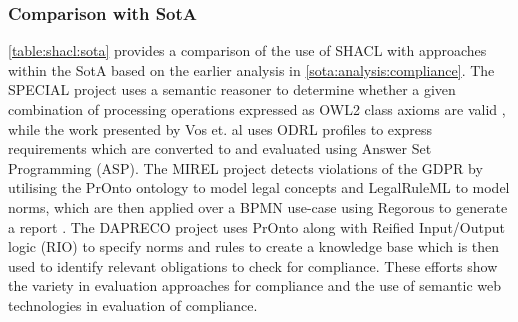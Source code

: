 \subsubsection*{Comparison with SotA}
\autoref{table:shacl:sota} provides a comparison of the use of SHACL with approaches within the SotA based on the earlier analysis in \autoref{sota:analysis:compliance}.
The SPECIAL project uses a semantic reasoner to determine whether a given combination of processing operations expressed as OWL2 class axioms are valid \cite{westphal_spirit_2018}, while the work presented by Vos et. al \cite{vos_odrl_2019} uses ODRL profiles to express requirements which are converted to and evaluated using Answer Set Programming (ASP).
The MIREL project detects violations of the GDPR by utilising the PrOnto ontology \cite{palmirani_pronto_2018,palmirani_pronto_2018-1,monica_modelling_2018} to model legal concepts and LegalRuleML to model norms, which are then applied over a BPMN use-case using Regorous to generate a report \cite{monica_modelling_2018}.
The DAPRECO project uses PrOnto along with Reified Input/Output logic (RIO) \cite{robaldo_reified_2017} to specify norms and rules to create a knowledge base \cite{bartolini_agile_2019} which is then used to identify relevant obligations to check for compliance.
These efforts show the variety in evaluation approaches for compliance and the use of semantic web technologies in evaluation of compliance.
